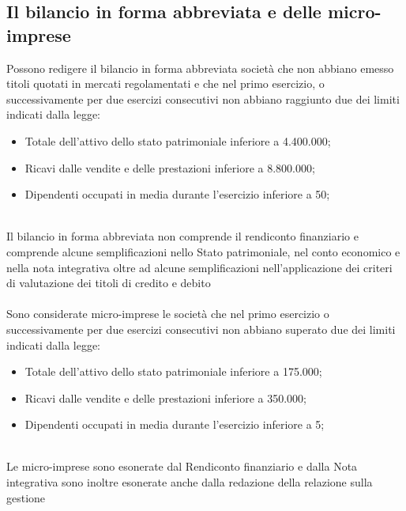 \documentclass{report}
\begin{document}
\subsection{Il bilancio in forma abbreviata e delle micro-imprese} %
\label{sub:Il bilancio in forma abbreviata e delle micro-imprese}
Possono redigere il bilancio in forma abbreviata società che non abbiano emesso titoli quotati in mercati regolamentati e che nel primo esercizio, o successivamente per due esercizi consecutivi non abbiano raggiunto due dei limiti indicati dalla legge:
\\
\begin{itemize}
  \item{Totale dell'attivo dello stato patrimoniale inferiore a 4.400.000;}
  \item{Ricavi dalle vendite e delle prestazioni inferiore a 8.800.000;}
  \item{Dipendenti occupati in media durante l'esercizio inferiore a 50;}
\end{itemize}
\\
Il bilancio in forma abbreviata non comprende il rendiconto finanziario e comprende alcune semplificazioni nello Stato patrimoniale, nel conto economico e nella nota integrativa oltre ad alcune semplificazioni nell'applicazione dei criteri di valutazione dei titoli di credito e debito
\\
\\
Sono considerate micro-imprese le società che nel primo esercizio o successivamente per due esercizi consecutivi non abbiano superato due dei limiti indicati dalla legge:
\\
\begin{itemize}
  \item{Totale dell'attivo dello stato patrimoniale inferiore a 175.000;}
  \item{Ricavi dalle vendite e delle prestazioni inferiore a 350.000;}
  \item{Dipendenti occupati in media durante l'esercizio inferiore a 5;}
\end{itemize}
\\
Le micro-imprese sono esonerate dal Rendiconto finanziario e dalla Nota integrativa sono inoltre esonerate anche dalla redazione della relazione sulla gestione
\end{document}
